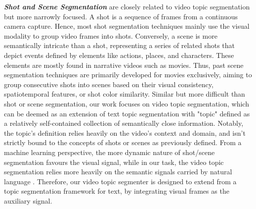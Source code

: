 \documentclass[runningheads]{llncs}
\begin{document}
\vspace{1ex}
\noindent
\textbf{\textit{Shot and Scene Segmentation}} are closely related to video topic segmentation but more narrowly focused. A shot is a sequence of frames from a continuous camera capture. Hence, most shot segmentation techniques mainly use the visual modality to group video frames into shots.
Conversely, a scene is more semantically intricate than a shot, representing a series of related shots that depict events defined by elements like actions, places, and characters. These elements are mostly found in narrative videos such as movies. Thus, past scene segmentation techniques are primarily developed for movies exclusively, aiming to group consecutive shots into scenes based on their visual consistency, spatiotemporal features, or shot color similarity.
Similar but more difficult than shot or scene segmentation, our work focuses on video topic segmentation, which can be deemed as an extension of text topic segmentation with "topic" defined as a relatively self-contained collection of semantically close information.
Notably, the topic's definition relies heavily on the video's context and domain, and isn't strictly bound to the concepts of shots or scenes as previously defined. 
From a machine learning perspective, the more dynamic nature of shot/scene segmentation favours the visual signal, while in our task, the video topic segmentation relies more heavily on the semantic signals carried by natural language \cite{nicolas-etal-combining-2011,Lorenzo-etal-2015}.
Therefore, our video topic segmenter is designed to extend from a topic segmentation framework for text, by integrating visual frames as the auxiliary signal.
\end{document}
